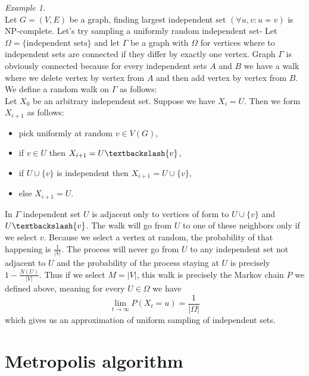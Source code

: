 \documentclass[a4paper, 12pt]{book}
\theoremstyle{definition}
\theoremstyle{remark}
\newtheorem*{ex}{Example}
\begin{document}
\begin{ex} \text{} \\
  Let $G = (V, E)$ be a graph, finding largest independent set $(\forall u,v: u \nsim v)$ is NP-complete. Let's try sampling a uniformly random independent set-
  Let $\Omega = \{\text{independent sets}\}$ and let $\Gamma$ be a graph with $\Omega$ for vertices where to independent sets are connected
  if they differ by exactly one vertex. Graph $\Gamma$ is obviously connected because for every independent sets $A$ and $B$ we have a walk where we
  delete vertex by vertex from $A$ and then add vertex by vertex from $B$. We define a random walk on $\Gamma$ as follows:\\
  Let $X_0$ be an arbitrary independent set. Suppose we have $X_i = U$. Then we form $X_{i+1}$ as follows:
  \begin{itemize}
    \item pick uniformly at random $v \in V(G)$,
    \item if $v \in U$ then $X_{i+1} = U \textbackslash \{v\}$,
    \item if $U \cup \{v\}$ is independent then $X_{i+1} = U \cup \{v\}$,
    \item else $X_{i+1} = U$.
  \end{itemize}
  In $\Gamma$ independent set $U$ is adjacent only to vertices of form to $U \cup \{v\}$ and $U \textbackslash \{v\}$. The walk will go from $U$
  to one of these neighbors only if we select $v$. Because we select a vertex at random, the probability of that happening is $\frac{1}{|V|}$.
  The process will never go from $U$ to any independent set not adjacent to $U$ and the probability of the process staying at $U$ is precisely
  $1 - \frac{N(U)}{|V|}$. Thus if we select $M = |V|$, this walk is precisely the Markov chain $P$ we defined above, meaning for every $U \in \Omega$
  we have
  $$\lim_{t \to \infty} P(X_t = u) = \frac{1}{|\Omega|}$$
  which gives us an approximation of uniform sampling of independent sets.
\end{ex}


\section{Metropolis algorithm}
\end{document}
